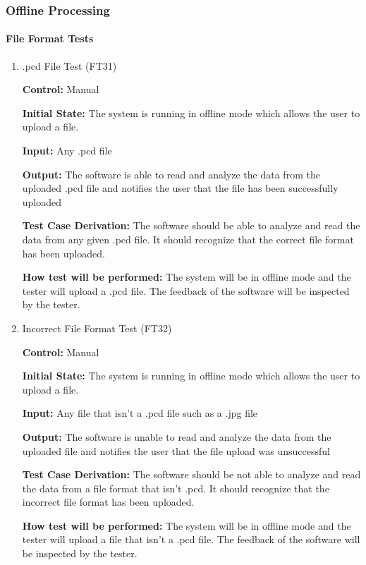 \documentclass[12pt, titlepage]{article}
\begin{document}
\subsubsection{Offline Processing}

\paragraph{File Format Tests}
\begin{enumerate}
\item{.pcd File Test (FT31)\label{FT31}\\}
  
\textbf{Control:} Manual

\textbf{Initial State:} The system is running in offline mode which allows the user to upload a file.

\textbf{Input:} Any .pcd file

\textbf{Output:} The software is able to read and analyze the data from the uploaded .pcd file and notifies the user that the file has been successfully uploaded

\textbf{Test Case Derivation:} The software should be able to analyze and read the data from any given .pcd file. It should recognize that the correct file format has been uploaded.

\textbf{How test will be performed:} The system will be in offline mode and the tester will upload a .pcd file. The feedback of the software will be inspected by the tester.

\item{Incorrect File Format Test (FT32)\label{FT32}\\}

\textbf{Control:} Manual

\textbf{Initial State:} The system is running in offline mode which allows the user to upload a file.

\textbf{Input:} Any file that isn’t a .pcd file such as a .jpg file

\textbf{Output:} The software is unable to read and analyze the data from the uploaded file and notifies the user that the file upload was unsuccessful

\textbf{Test Case Derivation:} The software should be not able to analyze and read the data from a file format that isn’t .pcd. It should recognize that the incorrect file format has been uploaded.

\textbf{How test will be performed:} The system will be in offline mode and the tester will upload a file that isn’t a .pcd file. The feedback of the software will be inspected by the tester.

\end{enumerate} 
\end{document}
